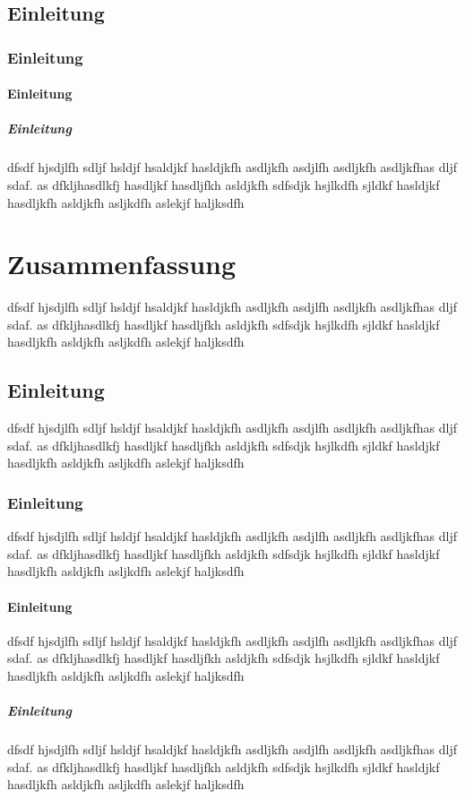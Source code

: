 \documentclass[ngerman,pdf]{wkcms}    %
\begin{document}
\subsection{Einleitung}
\subsubsection{Einleitung}
\paragraph{Einleitung}
\subparagraph{Einleitung}
dfsdf hjsdjlfh sdljf hsldjf hsaldjkf hasldjkfh asdljkfh asdjlfh asdljkfh
asdljkfhas dljf sdaf. as dfkljhasdlkfj hasdljkf hasdljfkh asldjkfh sdfsdjk
hsjlkdfh sjldkf hasldjkf hasdljkfh asldjkfh asljkdfh aslekjf haljksdfh

\section{Zusammenfassung}
dfsdf hjsdjlfh sdljf hsldjf hsaldjkf hasldjkfh asdljkfh asdjlfh asdljkfh
asdljkfhas dljf sdaf. as dfkljhasdlkfj hasdljkf hasdljfkh asldjkfh sdfsdjk
hsjlkdfh sjldkf hasldjkf hasdljkfh asldjkfh asljkdfh aslekjf haljksdfh

\subsection{Einleitung}
dfsdf hjsdjlfh sdljf hsldjf hsaldjkf hasldjkfh asdljkfh asdjlfh asdljkfh
asdljkfhas dljf sdaf. as dfkljhasdlkfj hasdljkf hasdljfkh asldjkfh sdfsdjk
hsjlkdfh sjldkf hasldjkf hasdljkfh asldjkfh asljkdfh aslekjf haljksdfh

\subsubsection{Einleitung}
dfsdf hjsdjlfh sdljf hsldjf hsaldjkf hasldjkfh asdljkfh asdjlfh asdljkfh
asdljkfhas dljf sdaf. as dfkljhasdlkfj hasdljkf hasdljfkh asldjkfh sdfsdjk
hsjlkdfh sjldkf hasldjkf hasdljkfh asldjkfh asljkdfh aslekjf haljksdfh

\paragraph{Einleitung}
dfsdf hjsdjlfh sdljf hsldjf hsaldjkf hasldjkfh asdljkfh asdjlfh asdljkfh
asdljkfhas dljf sdaf. as dfkljhasdlkfj hasdljkf hasdljfkh asldjkfh sdfsdjk
hsjlkdfh sjldkf hasldjkf hasdljkfh asldjkfh asljkdfh aslekjf haljksdfh

\subparagraph{Einleitung}
dfsdf hjsdjlfh sdljf hsldjf hsaldjkf hasldjkfh asdljkfh asdjlfh asdljkfh
asdljkfhas dljf sdaf. as dfkljhasdlkfj hasdljkf hasdljfkh asldjkfh sdfsdjk
hsjlkdfh sjldkf hasldjkf hasdljkfh asldjkfh asljkdfh aslekjf haljksdfh



\end{document}
